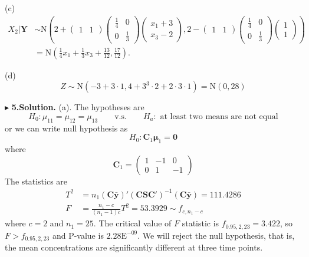 \documentclass[letterpaper, 12pt]{article}
\newcommand{\ba}{$$\begin{aligned}}
\newcommand{\ea}{\end{aligned}$$}
\newcommand{\lma}{\left(\begin{matrix}}
\newcommand{\rma}{\end{matrix}\right)}
\begin{document}
(c)
\ba
X_2|\bm{Y}&\sim\text{N}\left(2+\lma 1&1\rma\lma \frac14&0\\0&\frac13\rma\lma x_1+3\\x_3-2\rma, 2-\lma 1&1\rma\lma \frac14&0\\0&\frac13\rma\lma1\\1\rma\right)\\
&=\text{N}\left(\frac14x_1+\frac13x_3+\frac{13}{12},\frac{17}{12}\right).
\ea

(d) 
$$
Z\sim\text{N}(-3+3\cdot1,4+3^3\cdot2+2\cdot3\cdot1)=\text{N}(0,28)
$$

$\blacktriangleright$ \textbf{5.\quad Solution.}
(a). The hypotheses are
$$
H_0:\mu_{11}=\mu_{12}=\mu_{13}\qquad\text{v.s.}\qquad H_a: \text{ at least two means are not equal}
$$
or we can write null hypothesis as
$$
H_0: \bm{C}_1\bm{\mu}_1=\bm{0}
$$
where
$$
\bm{C}_1=\lma 1 &-1 &0\\ 0 &1 &-1\rma
$$
The statistics are
\ba
T^2&=n_1(\bm{C\bar{y}})'(\bm{CSC}')^{-1}(\bm{C\bar{y}})=111.4286\\
F&=\frac{n_1-c}{(n_1-1)c}T^2=53.3929\sim f_{c,n_1-c}
\ea
where $c=2$ and $n_1=25$. The critical value of $F$ statistic is $f_{0.95,2,23}=3.422$, so $F>f_{0.95,2,23}$ and P-value is $2.28\text{E}^{-09}$. We will reject the  null hypothesis, that is, the mean concentrations are significantly different at three time points.
\end{document}
